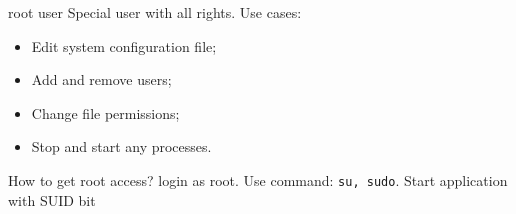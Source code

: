\begin{frame}[fragile]{root user}
 Special user with all rights. Use cases:
  \begin{itemize} 
    \item Edit system configuration file;
    \item Add and remove users;
    \item Change file permissions;
    \item Stop and start any processes.
  \end{itemize}
How to get root access? 
 \break
  login as root. Use command: \verb+su, sudo+. Start application with SUID bit 
\end{frame}
